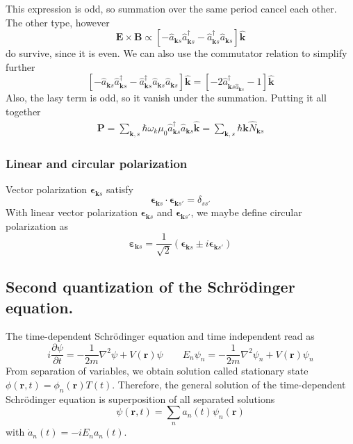 \documentclass[../../../main.tex]{subfiles}
\begin{document}
This expression is odd, so summation over the same period cancel each other.
The other type, however
\begin{equation*}
  \mathbf{E }\times \mathbf{B}  \propto
  \left[ -\hat{a}_{\mathbf{k }s} \hat{a}^\dagger_{\mathbf{k }s} - \hat{a}^\dagger_{\mathbf{k }s} \hat{a}_{\mathbf{k }s}  \right] \mathbf{\hat{k}}
\end{equation*}
do survive, since it is even.
We can also use the commutator relation to simplify further
\begin{equation*}
  \left[ -\hat{a}_{\mathbf{k }s} \hat{a}^\dagger_{\mathbf{k }s} - \hat{a}^\dagger_{\mathbf{k }s} \hat{a}_{\mathbf{k }s}    \hat{a}_{\mathbf{k }s}   \right] \hat{\mathbf{k}}
  = \left[ - 2\hat{a}^\dagger_{\mathbf{k }s \hat{a}_{\mathbf{k }s}  } -1\right] \mathbf{\hat{k}}
\end{equation*}
Also, the lasy term is odd, so it vanish under the summation.
Putting it all together
\begin{align*}
  \mathbf{P } =
  \sum_{\mathbf{k },s } \hbar \omega_k \mu_0 \hat{a}^\dagger_{\mathbf{k }s} \hat{a}_{\mathbf{k }s}  \mathbf{\hat{k }}
  = \sum_{\mathbf{k },s}\hbar \mathbf{k } \hat{N }_{\mathbf{k }s}
\end{align*}

\subsubsection{Linear and circular polarization}
Vector polarization $\boldsymbol{\epsilon}_{\mathbf{k }s}$ satisfy
\begin{equation*}
  \boldsymbol{\epsilon}_{\mathbf{k }s} \cdot \boldsymbol{\epsilon}_{\mathbf{k }s'}=\delta_{ss'}
\end{equation*}
With linear vector polarization $\boldsymbol{\epsilon}_{\mathbf{k }s}$ and $\boldsymbol{\epsilon}_{\mathbf{k }s'}$, we maybe define circular polarization as
\begin{equation*}
  \boldsymbol{\varepsilon}_{\mathbf{k }s} = \frac{1 }{\sqrt{2 }}\left( \boldsymbol{\epsilon}_{\mathbf{k }s}\pm i \boldsymbol{\epsilon}_{\mathbf{k }s'} \right)
\end{equation*}

\subsection{Second quantization of the Schrödinger equation.}
The time-dependent Schrödinger equation and time independent read as
\begin{equation*}
  i \frac{\partial \psi}{\partial t} = -\frac{1}{2m} \nabla^2 \psi + V(\mathbf{r})\psi \qquad
  E_n \psi_n = -\frac{1}{2m} \nabla^2 \psi_n + V(\mathbf{r})\psi_n
\end{equation*}
From separation of variables, we obtain solution called stationary state $\phi(\mathbf{r },t)=\phi_n (\mathbf{r})T(t)$.
Therefore, the general solution of the time-dependent Schrödinger equation is superposition of all separated solutions
\begin{equation*}
  \psi(\mathbf{r}, t) = \sum_n a_n(t) \psi_n(\mathbf{r})
\end{equation*}
with $\dot{a}_n(t) = -i E_n a_n(t) $.
\end{document}
